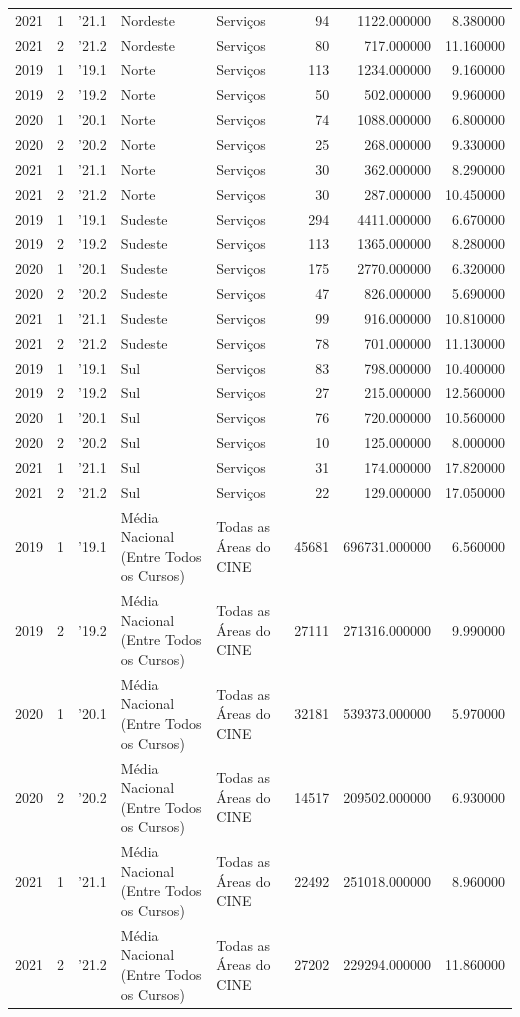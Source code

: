 \begin{longtable}{rrlllrrr}
2021 & 1 & '21.1 & Nordeste & Serviços & 94 & 1122.000000 & 8.380000 \\
2021 & 2 & '21.2 & Nordeste & Serviços & 80 & 717.000000 & 11.160000 \\
2019 & 1 & '19.1 & Norte & Serviços & 113 & 1234.000000 & 9.160000 \\
2019 & 2 & '19.2 & Norte & Serviços & 50 & 502.000000 & 9.960000 \\
2020 & 1 & '20.1 & Norte & Serviços & 74 & 1088.000000 & 6.800000 \\
2020 & 2 & '20.2 & Norte & Serviços & 25 & 268.000000 & 9.330000 \\
2021 & 1 & '21.1 & Norte & Serviços & 30 & 362.000000 & 8.290000 \\
2021 & 2 & '21.2 & Norte & Serviços & 30 & 287.000000 & 10.450000 \\
2019 & 1 & '19.1 & Sudeste & Serviços & 294 & 4411.000000 & 6.670000 \\
2019 & 2 & '19.2 & Sudeste & Serviços & 113 & 1365.000000 & 8.280000 \\
2020 & 1 & '20.1 & Sudeste & Serviços & 175 & 2770.000000 & 6.320000 \\
2020 & 2 & '20.2 & Sudeste & Serviços & 47 & 826.000000 & 5.690000 \\
2021 & 1 & '21.1 & Sudeste & Serviços & 99 & 916.000000 & 10.810000 \\
2021 & 2 & '21.2 & Sudeste & Serviços & 78 & 701.000000 & 11.130000 \\
2019 & 1 & '19.1 & Sul & Serviços & 83 & 798.000000 & 10.400000 \\
2019 & 2 & '19.2 & Sul & Serviços & 27 & 215.000000 & 12.560000 \\
2020 & 1 & '20.1 & Sul & Serviços & 76 & 720.000000 & 10.560000 \\
2020 & 2 & '20.2 & Sul & Serviços & 10 & 125.000000 & 8.000000 \\
2021 & 1 & '21.1 & Sul & Serviços & 31 & 174.000000 & 17.820000 \\
2021 & 2 & '21.2 & Sul & Serviços & 22 & 129.000000 & 17.050000 \\
2019 & 1 & '19.1 & Média Nacional (Entre Todos os Cursos) & Todas as Áreas do CINE & 45681 & 696731.000000 & 6.560000 \\
2019 & 2 & '19.2 & Média Nacional (Entre Todos os Cursos) & Todas as Áreas do CINE & 27111 & 271316.000000 & 9.990000 \\
2020 & 1 & '20.1 & Média Nacional (Entre Todos os Cursos) & Todas as Áreas do CINE & 32181 & 539373.000000 & 5.970000 \\
2020 & 2 & '20.2 & Média Nacional (Entre Todos os Cursos) & Todas as Áreas do CINE & 14517 & 209502.000000 & 6.930000 \\
2021 & 1 & '21.1 & Média Nacional (Entre Todos os Cursos) & Todas as Áreas do CINE & 22492 & 251018.000000 & 8.960000 \\
2021 & 2 & '21.2 & Média Nacional (Entre Todos os Cursos) & Todas as Áreas do CINE & 27202 & 229294.000000 & 11.860000 \\
\end{longtable}
